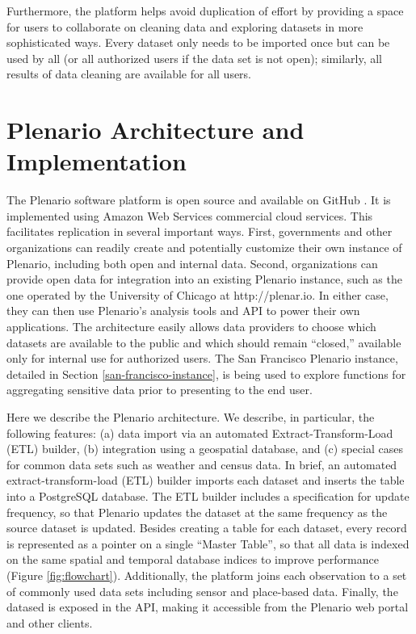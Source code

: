 \documentclass[11pt]{article}
\begin{document}
Furthermore, the platform helps avoid duplication of effort by providing a space for users to collaborate on cleaning data and exploring datasets in more sophisticated ways. Every dataset only needs to be imported once but can be used by all (or all authorized users if the data set is not open); similarly, all results of data cleaning are available for all users.

\section{Plenario Architecture and Implementation}
The Plenario software platform is open source and available on GitHub \cite{plenario-github}. It is implemented using Amazon Web Services commercial cloud services. This facilitates replication in several important ways. First, governments and other organizations can readily create and potentially customize their own instance of Plenario, including both open and internal data. Second, organizations can provide open data for integration into an existing Plenario instance, such as the one operated by the University of Chicago at http://plenar.io. In either case, they can then use Plenario's analysis tools and API to power their own applications. The architecture easily allows data providers to choose which datasets are available to the public and which should remain ``closed,'' available only for internal use for authorized users. The San Francisco Plenario instance, detailed in Section \ref{san-francisco-instance}, is being used to explore functions for aggregating sensitive data prior to presenting to the end user. 

Here we describe the Plenario architecture. We describe, in particular, the following features: (a) data import via an automated Extract-Transform-Load (ETL) builder, (b) integration using a geospatial database, and (c) special cases for common data sets such as weather and census data. In brief, an automated extract-transform-load (ETL) builder imports each dataset and inserts the table into a PostgreSQL database. The ETL builder includes a specification for update frequency, so that Plenario updates the dataset at the same frequency as the source dataset is updated. Besides creating a table for each dataset, every record is represented as a pointer on a single ``Master Table'', so that all data is indexed on the same spatial and temporal database indices to improve performance (Figure \ref{fig:flowchart}). Additionally, the platform joins each observation to a set of commonly used data sets including sensor and place-based data. Finally, the datased is exposed in the API, making it accessible from the Plenario web portal and other clients.
\end{document}
